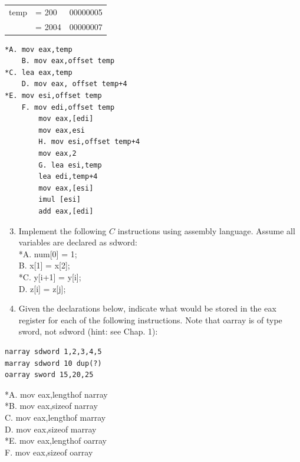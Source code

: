 \documentclass[10pt]{book}
\begin{document}
\begin{center}
\begin{tabular}{lll}
\hline
temp & = 200  & 00000005 \\
     & = 2004 & 00000007 \\
\hline
\end{tabular}
\end{center}

\begin{verbatim}
*A. mov eax,temp
    B. mov eax,offset temp
*C. lea eax,temp
    D. mov eax, offset temp+4
*E. mov esi,offset temp
    F. mov edi,offset temp
        mov eax,[edi]
        mov eax,esi
        H. mov esi,offset temp+4
        mov eax,2
        G. lea esi,temp
        lea edi,temp+4
        mov eax,[esi]
        imul [esi]
        add eax,[edi]
\end{verbatim}

\begin{enumerate}
  \setcounter{enumi}{2}
  \item Implement the following $C$ instructions using assembly language. Assume all variables are declared as sdword:\\
*A. num[0] = 1;\\
B. x[1] = x[2];\\
*C. y[i+1] = y[i];\\
D. z[i] = z[j];
  \item Given the declarations below, indicate what would be stored in the eax register for each of the following instructions. Note that oarray is of type sword, not sdword (hint: see Chap. 1):
\end{enumerate}

\begin{verbatim}
narray sdword 1,2,3,4,5
marray sdword 10 dup(?)
oarray sword 15,20,25
\end{verbatim}

*A. mov eax,lengthof narray\\
*B. mov eax,sizeof narray\\
C. mov eax,lengthof marray\\
D. mov eax,sizeof marray\\
*E. mov eax,lengthof oarray\\
F. mov eax,sizeof oarray\\
\end{document}
